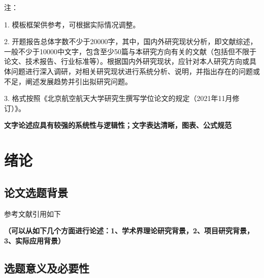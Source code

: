 注：

1. 模板框架供参考，可根据实际情况调整。

2. 开题报告总体字数不少于20000字，其中，国内外研究现状分析，即文献综述，一般不少于10000中文字，包含至少50篇与本研究方向有关的文献（包括但不限于论文、技术报告、行业标准等）。根据国内外研究现状，应针对本人研究方向或具体问题进行深入调研，对相关研究现状进行系统分析、说明，并指出存在的问题或不足，阐述发展趋势并引出拟研究问题。

3. 格式按照《北京航空航天大学研究生撰写学位论文的规定（2021年11月修订）》。

\textbf{\color{red} 文字论述应具有较强的系统性与逻辑性；文字表达清晰，图表、公式规范}


\section{绪论}

\subsection{论文选题背景}
参考文献引用如下

\textbf{\color{red}（可以从如下几个方面进行论述：1、学术界理论研究背景，2、项目研究背景，3、实际应用背景）}

\subsection{选题意义及必要性}

\clearpage
